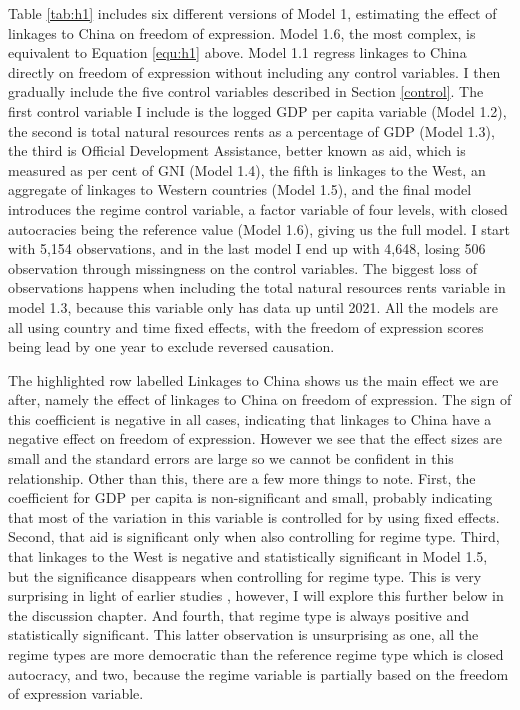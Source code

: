 Table \ref{tab:h1} includes six different versions of Model 1, estimating the effect of linkages to China on freedom of expression. Model 1.6, the most complex, is equivalent to Equation \ref{equ:h1} above. Model 1.1 regress linkages to China directly on freedom of expression without including any control variables. I then gradually include the five control variables described in Section \ref{control}. The first control variable I include is the logged GDP per capita variable (Model 1.2), the second is total natural resources rents as a percentage of GDP (Model 1.3), the third is Official Development Assistance, better known as aid, which is measured as per cent of GNI (Model 1.4), the fifth is linkages to the West, an aggregate of linkages to Western countries (Model 1.5), and the final model introduces the regime control variable, a factor variable of four levels, with closed autocracies being the reference value (Model 1.6), giving us the full model.  I start with 5,154 observations, and in the last model I end up with 4,648, losing 506 observation through missingness on the control variables. The biggest loss of observations happens when including the total natural resources rents variable in model 1.3, because this variable only has data up until 2021. All the models are all using country and time fixed effects, with the freedom of expression scores being lead by one year to exclude reversed causation. 

The highlighted row labelled Linkages to China shows us the main effect we are after, namely the effect of linkages to China on freedom of expression. The sign of this coefficient is negative in all cases, indicating that linkages to China have a negative effect on freedom of expression. However we see that the effect sizes are small and the standard errors are large so we cannot be confident in this relationship. Other than this, there are a few more things to note. First, the coefficient for GDP per capita is non-significant and small, probably indicating that most of the variation in this variable is controlled for by using fixed effects. Second, that aid is significant only when also controlling for regime type. Third, that linkages to the West is negative and statistically significant in Model 1.5, but the significance disappears when controlling for regime type. This is very surprising in light of earlier studies \citep{levitsky_linkage_2006}, however, I will explore this further below in the discussion chapter. And fourth, that regime type is always positive and statistically significant. This latter observation is unsurprising as one, all the regime types are more democratic than the reference regime type which is closed autocracy, and two, because the regime variable is partially based on the freedom of expression variable.

